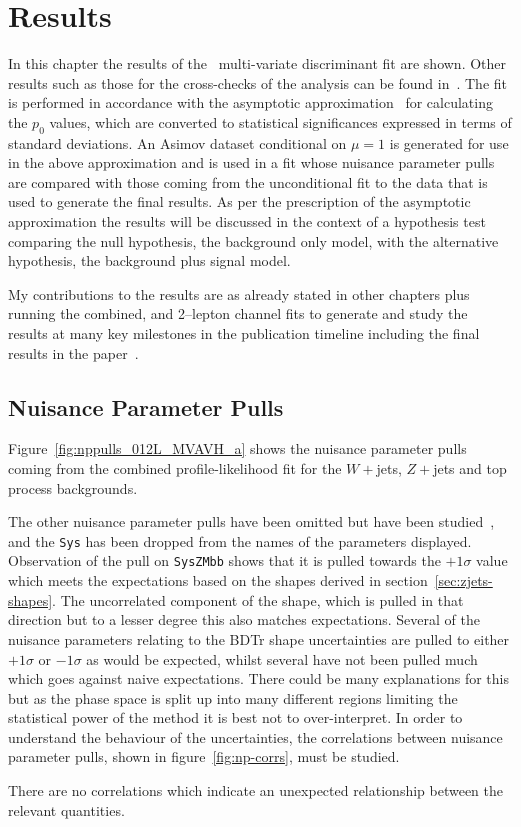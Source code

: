 \chapter{Results}%
\label{ch:results}
In this chapter the results of the \VHbb\ multi-variate discriminant fit are
shown. Other results such as those for the cross-checks of the analysis can be
found in~\cite{VHMainNote2019}. The fit is performed in accordance with the
asymptotic approximation~\cite{Cowan:2010js} for calculating the $p_0$ values,
which are converted to statistical significances expressed in terms of standard
deviations. An Asimov dataset conditional on $\mu=1$  is generated for use in
the above approximation and is used in a fit whose nuisance parameter pulls are
compared with those coming from the unconditional fit to the data that is used
to generate the final results. As per the prescription of the asymptotic
approximation the results will be discussed in the context of a hypothesis test
comparing the null hypothesis, the background only model, with the alternative
hypothesis, the background plus signal model.

My contributions to the results are as already stated in other chapters plus
running the combined, and 2--lepton channel fits to generate and study the
results at many key milestones in the publication timeline including the final
results in the paper~\cite{final-paper}.

\section{Nuisance Parameter Pulls}
Figure~\ref{fig:nppulls_012L_MVAVH_a} shows the nuisance parameter pulls coming
from the combined profile-likelihood fit for the $W+$jets, $Z+$jets and top
process backgrounds.

The other nuisance parameter pulls have been omitted but have been
studied~\cite{VHMainNote2019}, and the \texttt{Sys} has been dropped from the
names of the parameters displayed. Observation of the pull on \texttt{SysZMbb}
shows that it is pulled towards the $+1\sigma$ value which meets the
expectations based on the shapes derived in section~\ref{sec:zjets-shapes}. The
uncorrelated component of the shape, which is pulled in that direction but to a
lesser degree this also matches expectations. Several of the nuisance parameters
relating to the BDTr shape uncertainties are pulled to either $+1\sigma$ or
$-1\sigma$ as would be expected, whilst several have not been pulled much which
goes against naive expectations. There could be many explanations for this but
as the phase space is split up into many different regions limiting the
statistical power of the method it is best not to over-interpret. In order to
understand the behaviour of the uncertainties, the correlations between nuisance
parameter pulls, shown in figure~\ref{fig:np-corrs}, must be studied.

There are no correlations which indicate an unexpected relationship between the
relevant quantities.


